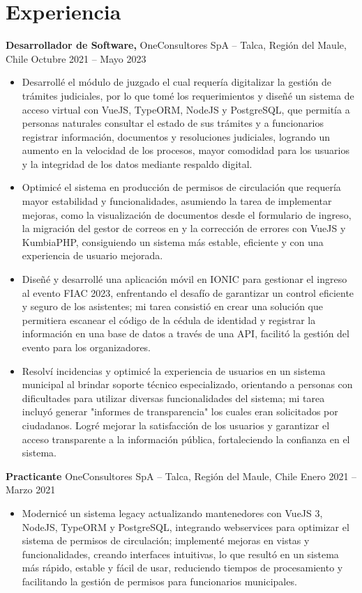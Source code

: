 \documentclass[11pt]{article}       %
\begin{document}
\section*{Experiencia}
\textbf{Desarrollador de Software,} {OneConsultores SpA} -- Talca, Regi\'on del Maule, Chile \hfill Octubre 2021 -- Mayo 2023 \\
\vspace{-9pt}
\begin{itemize}
  \item Desarrollé el módulo de juzgado el cual requería digitalizar la gestión de trámites judiciales, por lo que tomé los requerimientos y diseñé un sistema de acceso virtual con VueJS, TypeORM, NodeJS y PostgreSQL, que permitía a personas naturales consultar el estado de sus trámites y a funcionarios registrar información, documentos y resoluciones judiciales, logrando un aumento en la velocidad de los procesos, mayor comodidad para los usuarios y la integridad de los datos mediante respaldo digital.
  \item Optimicé el sistema en producción de permisos de circulación que requería mayor estabilidad y funcionalidades, asumiendo la tarea de implementar mejoras, como la visualización de documentos desde el formulario de ingreso, la migración del gestor de correos en y la corrección de errores con VueJS y KumbiaPHP, consiguiendo un sistema más estable, eficiente y con una experiencia de usuario mejorada.
  \item Diseñé y desarrollé una aplicación móvil en IONIC para gestionar el ingreso al evento FIAC 2023, enfrentando el desafío de garantizar un control eficiente y seguro de los asistentes; mi tarea consistió en crear una solución que permitiera escanear el código de la cédula de identidad y registrar la información en una base de datos a través de una API, facilitó la gestión del evento para los organizadores.
  \item Resolví incidencias y optimicé la experiencia de usuarios en un sistema municipal al brindar soporte técnico especializado, orientando a personas con dificultades para utilizar diversas funcionalidades del sistema; mi tarea incluyó generar "informes de transparencia" los cuales eran solicitados por ciudadanos. Logré mejorar la satisfacción de los usuarios y garantizar el acceso transparente a la información pública, fortaleciendo la confianza en el sistema.
\end{itemize}

\textbf{Practicante} {OneConsultores SpA} -- Talca, Regi\'on del Maule, Chile \hfill Enero 2021 -- Marzo 2021 \\
\vspace{-9pt}
\begin{itemize}
  \item Modernicé un sistema legacy actualizando mantenedores con VueJS 3, NodeJS, TypeORM y PostgreSQL, integrando webservices para optimizar el sistema de permisos de circulación; implementé mejoras en vistas y funcionalidades, creando interfaces intuitivas, lo que resultó en un sistema más rápido, estable y fácil de usar, reduciendo tiempos de procesamiento y facilitando la gestión de permisos para funcionarios municipales.
\end{itemize}
\end{document}
